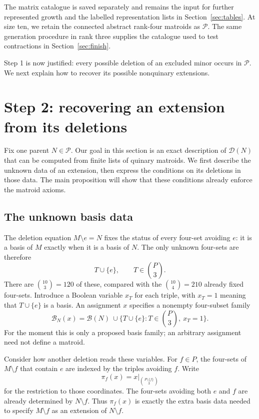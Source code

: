 \documentclass[11pt,a4paper]{article}
\theoremstyle{definition}
\newcommand{\B}{\mathcal B}
\begin{document}
The matrix catalogue is saved separately and remains the input for
further represented growth and the labelled representation lists
in Section~\ref{sec:tables}. %
At size ten, we retain the connected
abstract rank-four matroids as $\mathcal P$. The same generation
procedure in rank three supplies the catalogue used to test
contractions in Section~\ref{sec:finish}.

Step 1 is now justified: every possible deletion of an excluded minor
occurs in $\mathcal P$. We next explain how to recover its possible
nonquinary extensions. %

\section{Step 2: recovering an extension from its deletions}\label{sec:local}

Fix one parent $N\in\mathcal P$. Our goal in this section is an exact
description of $\mathcal D(N)$ that can be computed from finite lists
of quinary matroids. We first describe the unknown data of an
extension, then express the conditions on its deletions in those
data. The main proposition will show that these conditions already
enforce the matroid axioms.

\subsection{The unknown basis data}

The deletion equation $M\setminus e=N$ fixes the status of every
four-set avoiding $e$: it is a basis of $M$ exactly when it is a
basis of $N$. The only unknown four-sets are therefore
\[
 T\cup\{e\},\qquad T\in\binom P3.
\]
There are $\binom{10}{3}=120$ of these, compared with the
$\binom{10}{4}=210$ already fixed four-sets. Introduce a Boolean
variable $x_T$ for each triple, with $x_T=1$ meaning that
$T\cup\{e\}$ is a basis. An assignment $x$ specifies a nonempty
four-subset family
\[
 \B_N(x)=\B(N)\ \cup
          \{T\cup\{e\}:T\in\binom P3,\ x_T=1\}.
\]
For the moment this is only a proposed basis family; an arbitrary
assignment need not define a matroid.

Consider how another deletion reads these variables. For $f\in P$,
the four-sets of $M\setminus f$ that contain $e$ are indexed by the
triples avoiding $f$. Write
\[
 \pi_f(x)=x\big|_{\binom{P\setminus\{f\}}3}
\]
for the restriction to those coordinates. The four-sets avoiding
both $e$ and $f$ are already determined by $N\setminus f$. Thus
$\pi_f(x)$ is exactly the extra basis data needed to specify
$M\setminus f$ as an extension of $N\setminus f$.
\end{document}
